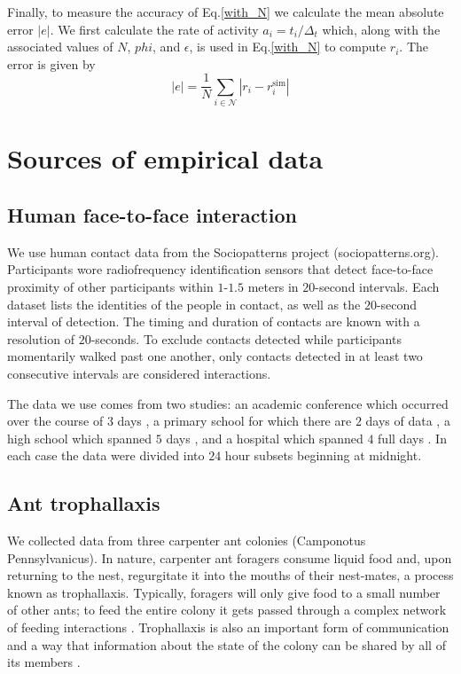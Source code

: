 \documentclass[10pt]{article}
\begin{document}
\begin{multicols}{2}
Finally, to measure the accuracy of Eq.\eqref{with_N} we calculate the mean absolute error $|e|$. We first calculate the rate of activity $a_{i}=t_{i}/\Delta_{t}$ which, along with the associated values of $N$, $phi$, and $\epsilon$, is used in Eq.\eqref{with_N} to compute $r_{i}$. The error is given by 
\begin{equation}
|e|=\frac{1}{N}\sum_{i\in\mathcal{N}}|r_{i}-r_{i}^{\text{sim}}|
\end{equation}

\section{Sources of empirical data}
\label{data}
\subsection{Human face-to-face interaction}
We use human contact data from the Sociopatterns project (sociopatterns.org). Participants wore radiofrequency identification sensors that detect face-to-face proximity of other participants within $1$-$1.5$ meters in $20$-second intervals. Each dataset lists the identities of the people in contact, as well as the $20$-second interval of detection. The timing and duration of contacts are known with a resolution of $20$-seconds. To exclude contacts detected while participants momentarily walked past one another, only contacts detected in at least two consecutive intervals are considered interactions.

The data we use comes from two studies: an academic conference which occurred over the course of $3$ days \cite{isella2011s}, a primary school for which there are $2$ days of data \cite{10.1371/journal.pone.0023176}, a high school which spanned $5$ days \cite{10.1371/journal.pone.0136497}, and a hospital which spanned $4$ full days \cite{10.1371/journal.pone.0073970}. In each case the data were divided into $24$ hour subsets beginning at midnight.

\subsection{Ant trophallaxis}
We collected data from three carpenter ant colonies (Camponotus Pennsylvanicus). In nature, carpenter ant foragers consume liquid food and, upon returning to the nest, regurgitate it into the mouths of their nest-mates, a process known as trophallaxis. Typically, foragers will only give food to a small number of other ants; to feed the entire colony it gets passed through a complex network of feeding interactions \cite{quevillon2015social}. Trophallaxis is also an important form of communication and a way that information about the state of the colony can be shared by all of its members \cite{greenwald2015ant,10.7554/eLife.20375}.


\end{multicols}
\end{document}
